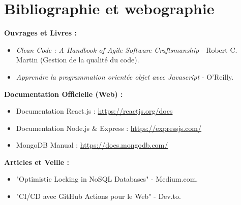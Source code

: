 \chapter*{Bibliographie et webographie}

\textbf{Ouvrages et Livres :}
\begin{itemize}
    \item \textit{Clean Code : A Handbook of Agile Software Craftsmanship} - Robert C. Martin (Gestion de la qualité du code).
    \item \textit{Apprendre la programmation orientée objet avec Javascript} - O'Reilly.
\end{itemize}

\textbf{Documentation Officielle (Web) :}
\begin{itemize}
    \item Documentation React.js : \url{https://reactjs.org/docs}
    \item Documentation Node.js \& Express : \url{https://expressjs.com/}
    \item MongoDB Manual : \url{https://docs.mongodb.com/}
\end{itemize}

\textbf{Articles et Veille :}
\begin{itemize}
    \item "Optimistic Locking in NoSQL Databases" - Medium.com.
    \item "CI/CD avec GitHub Actions pour le Web" - Dev.to.
\end{itemize}
